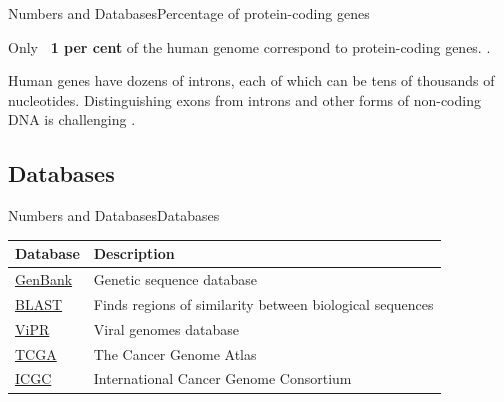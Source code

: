 \documentclass[10pt]{beamer}
\begin{document}
{\begin{frame}{Numbers and Databases}{Percentage of protein-coding genes}
\begin{block}{}
\centering
Only \textbf{\string ~1 per cent} of the human genome correspond to protein-coding genes. \cite{archibald2018genomics}.
\end{block}

\begin{block}{}
\centering
Human genes have dozens of introns, each of which can be tens of thousands of nucleotides. Distinguishing exons from introns and other forms of non-coding DNA is challenging \cite{archibald2018genomics}.
\end{block}

\end{frame}

\subsection{Databases}

\begin{frame}{Numbers and Databases}{Databases}

\begin{tabular}{ll}
\textbf{Database} & \textbf{Description}                                                \\
\hline
\href{https://www.ncbi.nlm.nih.gov/genbank/}{GenBank}   & Genetic sequence database                                       \\
\href{https://blast.ncbi.nlm.nih.gov/Blast.cgi}{BLAST}    & Finds regions of similarity between biological sequences    \\
\href{https://www.viprbrc.org/}{ViPR}     & Viral genomes database                                                       \\
\href{https://www.cancer.gov/}{TCGA}     & The Cancer Genome Atlas                                                       \\
 \href{https://dcc.icgc.org/}{ICGC}     & International Cancer Genome Consortium                        \\      
\end{tabular}

\end{frame}


}
\end{document}
